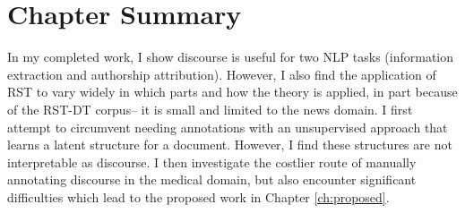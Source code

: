 
\section{Chapter Summary}
In my completed work, I show discourse is useful for two NLP tasks (information extraction and authorship attribution). However, I also find the application of RST to vary widely in which parts and how the theory is applied, in part because of the RST-DT corpus-- it is small and limited to the news domain. I first attempt to circumvent needing annotations with an unsupervised approach that learns a latent structure for a document. However, I find these structures are not interpretable as discourse. I then investigate the costlier route of manually annotating discourse in the medical domain, but also encounter significant difficulties which lead to the proposed work in Chapter \ref{ch:proposed}.

